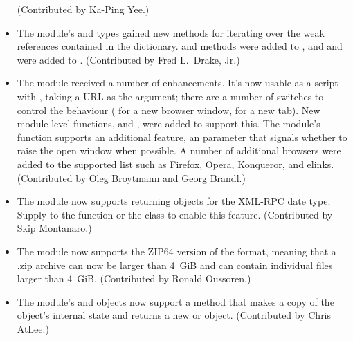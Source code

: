 \documentclass{howto}
\begin{document}
\begin{itemize}
(Contributed by Ka-Ping Yee.)

\item The  module's  and
 types gained new methods for iterating
over the weak references contained in the dictionary. 
 and  methods were
added to , and
 and  were added to
.  (Contributed by Fred L.~Drake, Jr.)

\item The  module received a number of
enhancements.
It's now usable as a script with , taking a
URL as the argument; there are a number of switches 
to control the behaviour ( for a new browser window, 
 for a new tab).  New module-level functions,
 and , were added 
to support this.  The module's  function supports an
additional feature, an  parameter that signals whether
to raise the open window when possible. A number of additional
browsers were added to the supported list such as Firefox, Opera,
Konqueror, and elinks.  (Contributed by Oleg Broytmann and Georg
Brandl.)

\item The  module now supports returning 
       objects for the XML-RPC date type.  Supply 
       to the  function
      or the  class to enable this feature.
      (Contributed by Skip Montanaro.)

\item The  module now supports the ZIP64 version of the 
format, meaning that a .zip archive can now be larger than 4~GiB and
can contain individual files larger than 4~GiB.  (Contributed by
Ronald Oussoren.)

\item The  module's  and 
objects now support a  method that makes a copy of the 
object's internal state and returns a new 
 or  object. 
(Contributed by Chris AtLee.)

\end{itemize}
\end{document}
